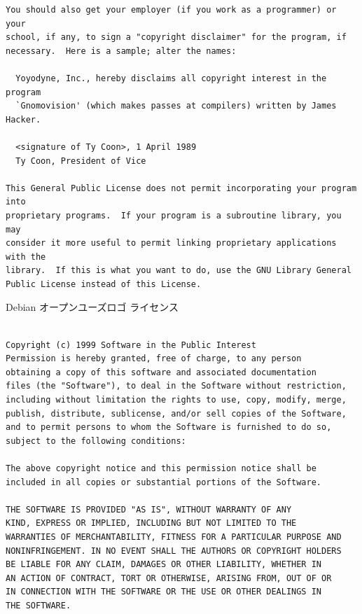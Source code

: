 \documentclass[mingoth,a4paper]{jsarticle}
\begin{document}
\begin{multicols}{2}
\begin{fontsize}{6}{6}
\begin{verbatim}
You should also get your employer (if you work as a programmer) or your
school, if any, to sign a "copyright disclaimer" for the program, if
necessary.  Here is a sample; alter the names:

  Yoyodyne, Inc., hereby disclaims all copyright interest in the program
  `Gnomovision' (which makes passes at compilers) written by James Hacker.

  <signature of Ty Coon>, 1 April 1989
  Ty Coon, President of Vice

This General Public License does not permit incorporating your program into
proprietary programs.  If your program is a subroutine library, you may
consider it more useful to permit linking proprietary applications with the
library.  If this is what you want to do, use the GNU Library General
Public License instead of this License.
 \end{verbatim}
 \end{fontsize}
\end{multicols}

\begin{center}
Debian オープンユーズロゴ ライセンス
\end{center}

\begin{multicols}{2}
 \begin{fontsize}{6}{6}
 \begin{verbatim}

Copyright (c) 1999 Software in the Public Interest
Permission is hereby granted, free of charge, to any person
obtaining a copy of this software and associated documentation
files (the "Software"), to deal in the Software without restriction,
including without limitation the rights to use, copy, modify, merge,
publish, distribute, sublicense, and/or sell copies of the Software,
and to permit persons to whom the Software is furnished to do so,
subject to the following conditions:

The above copyright notice and this permission notice shall be
included in all copies or substantial portions of the Software.

THE SOFTWARE IS PROVIDED "AS IS", WITHOUT WARRANTY OF ANY
KIND, EXPRESS OR IMPLIED, INCLUDING BUT NOT LIMITED TO THE
WARRANTIES OF MERCHANTABILITY, FITNESS FOR A PARTICULAR PURPOSE AND
NONINFRINGEMENT. IN NO EVENT SHALL THE AUTHORS OR COPYRIGHT HOLDERS
BE LIABLE FOR ANY CLAIM, DAMAGES OR OTHER LIABILITY, WHETHER IN
AN ACTION OF CONTRACT, TORT OR OTHERWISE, ARISING FROM, OUT OF OR
IN CONNECTION WITH THE SOFTWARE OR THE USE OR OTHER DEALINGS IN
THE SOFTWARE.
 \end{verbatim}
 \end{fontsize}
\end{multicols}
\end{document}
